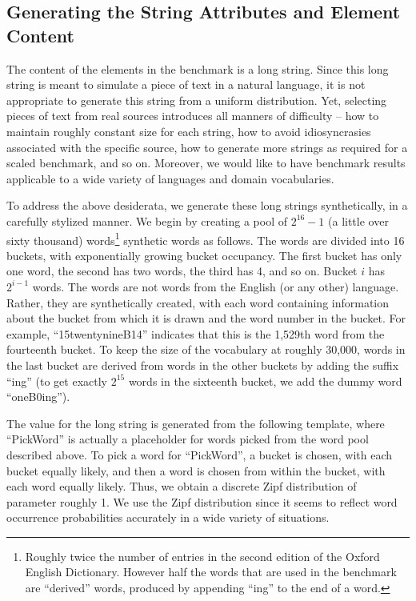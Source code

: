 \subsection{Generating the String Attributes and Element Content}
\label{sec:strings}
The content of the elements in the benchmark is a long string.  Since
this long string is meant to simulate a piece of text in a natural
language, it is not appropriate to generate this string from a uniform
distribution.  Yet, selecting pieces of text from real sources
introduces all manners of difficulty -- how to maintain roughly
constant size for each string, how to avoid idiosyncrasies associated
with the specific source, how to generate more strings as required for
a scaled benchmark, and so on.  Moreover, we would like to have
benchmark results applicable to a wide variety of languages and domain
vocabularies.

To address the above desiderata, we generate these long strings
synthetically, in a carefully stylized manner.  We begin by creating a
pool of $2^{16}-1$ (a little over sixty thousand)
words\footnote{Roughly twice the number of entries in the second
edition of the Oxford English Dictionary. However half the words that
are used in the benchmark are ``derived'' words, produced by appending
``ing'' to the end of a word.} synthetic words as follows. The words
are divided into 16 buckets, with exponentially growing bucket
occupancy.  The first bucket has only one word, the second has two
words, the third has 4, and so on.  Bucket $i$ has $2^{i-1}$ words.
The words are not words from the English (or any other) language.
Rather, they are synthetically created, with each word containing
information about the bucket from which it is drawn and the word
number in the bucket.  For example, ``15twentynineB14'' indicates that
this is the 1,529th word from the fourteenth bucket.  To keep the size
of the vocabulary at roughly 30,000, words in the last bucket are
derived from words in the other buckets by adding the suffix ``ing''
(to get exactly $2^{15}$ words in the sixteenth bucket, we add the
dummy word ``oneB0ing'').

The value for the long string is generated from the following
template, where ``PickWord'' is actually a placeholder for words
picked from the word pool described above.  To pick a word for
``PickWord'', a bucket is chosen, with each bucket equally likely, and
then a word is chosen from within the bucket, with each word equally
likely. Thus, we obtain a discrete Zipf distribution of parameter
roughly 1.  We use the Zipf distribution since it seems to reflect
word occurrence probabilities accurately in a wide variety of
situations.

